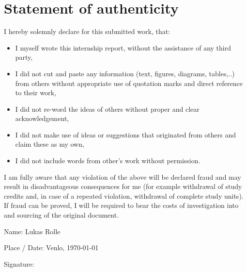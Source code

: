 \chapter*{Statement of authenticity}
I hereby solemnly declare for this submitted work, that:

\begin{itemize}
	\item I myself wrote this internship report, without the assistance of any third party,
	\item I did not cut and paste any information (text, figures, diagrams, tables,..) from others without appropriate use of quotation marks and direct reference to their work,
	\item I did not re-word the ideas of others without proper and clear acknowledgement,
	\item I did not make use of ideas or suggestions that originated from others and claim these as my own,
	\item I did not include words from other’s work without permission.
\end{itemize}

I am fully aware that any violation of the above will be declared fraud and may result in disadvantageous consequences for me (for example withdrawal of study credits and, in case of a repeated violation, withdrawal of complete study units). If fraud can be proved, I will be required to bear the costs of investigation into and sourcing of the original document.


Name: Lukas Rolle

Place / Date: Venlo, \today


Signature: